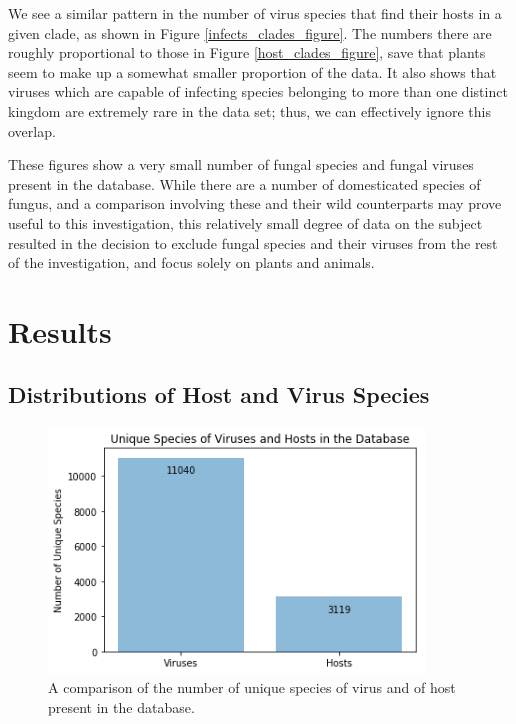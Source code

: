 \documentclass[12pt]{article}
\begin{document}
    

    We see a similar pattern in the number of virus species that find their
    hosts in a given clade, as shown in Figure \ref{infects_clades_figure}.
    The numbers there are roughly proportional to those in Figure
    \ref{host_clades_figure}, save that plants seem to make up a somewhat
    smaller proportion of the data. It also shows that viruses
    which are capable of infecting species belonging to more than one distinct
    kingdom are extremely rare in the data set; thus, we can effectively ignore
    this overlap.

    These figures show a very small number of fungal species and fungal viruses
    present in the database. While there are a number of domesticated species of
    fungus, and a comparison involving these and their wild counterparts may
    prove useful to this investigation, this relatively small degree of data
    on the subject resulted in the decision to exclude fungal species and their
    viruses from the rest of the investigation, and focus solely on plants and
    animals.


    \section{Results}
    
    \subsection{Distributions of Host and Virus Species}

    \begin{figure}[H]
        \begin{center}
            \includegraphics[width=100mm]{unique_species_figure.png}
            \caption{A comparison of the number of unique species of virus and of
            host present in the database.}
            \label{unique_species_figure}
        \end{center}
    \end{figure}
\end{document}
